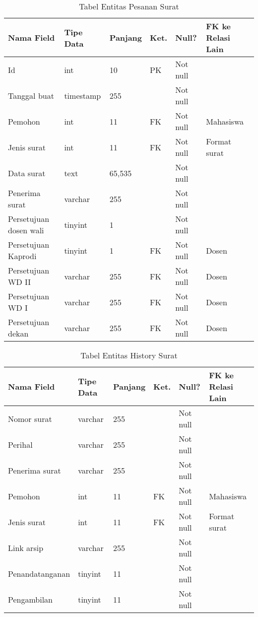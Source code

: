\begin{table}[H]
\centering
\caption{Tabel Entitas Pesanan Surat}
\label{entitas_pesanan_surat}
\begin{tabular}{|l|l|l|l|l|l|}
\hline
\textbf{Nama Field}&\textbf{Tipe Data}&\textbf{Panjang}&\textbf{Ket.}&\textbf{Null?}&\textbf{FK ke Relasi Lain}\\ \hline
Id&int&10&PK&Not null&\\ \hline
Tanggal buat&timestamp&255&&Not null&\\ \hline
Pemohon&int&11&FK&Not null&Mahasiswa\\ \hline
Jenis surat&int&11&FK&Not null&Format surat\\ \hline
Data surat&text&65,535&&Not null&\\ \hline
Penerima surat&varchar&255&&Not null&\\ \hline
Persetujuan dosen wali&tinyint&1&&Not null&\\ \hline
Persetujuan Kaprodi&tinyint&1&FK&Not null&Dosen\\ \hline
Persetujuan WD II&varchar&255&FK&Not null&Dosen\\ \hline
Persetujuan WD I&varchar&255&FK&Not null&Dosen\\ \hline
Persetujuan dekan&varchar&255&FK&Not null&Dosen\\ \hline
\end{tabular}
\end{table}

\begin{table}[H]
\centering
\caption{Tabel Entitas History Surat}
\label{entitas_history_surat}
\begin{tabular}{|l|l|l|l|l|l|}
\hline
\textbf{Nama Field}&\textbf{Tipe Data}&\textbf{Panjang}&\textbf{Ket.}&\textbf{Null?}&\textbf{FK ke Relasi Lain}\\ \hline
Nomor surat&varchar&255&&Not null&\\ \hline
Perihal&varchar&255&&Not null&\\ \hline
Penerima surat&varchar&255&&Not null&\\ \hline
Pemohon&int&11&FK&Not null&Mahasiswa\\ \hline
Jenis surat&int&11&FK&Not null&Format surat\\ \hline
Link arsip&varchar&255&&Not null&\\ \hline
Penandatanganan&tinyint&11&&Not null&\\ \hline
Pengambilan&tinyint&11&&Not null&\\ \hline
\end{tabular}
\end{table}

